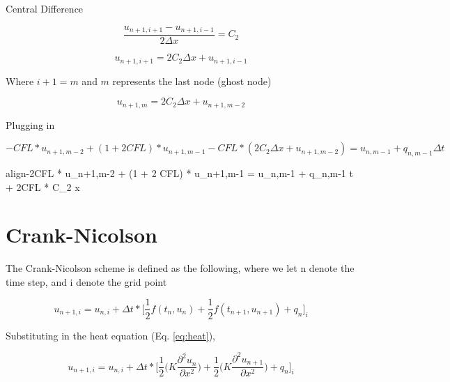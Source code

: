 \documentclass[10pt, letter, showtrims]{extarticle}
\newcommand{\boxedeq}[2]{\begin{empheq}[box={\fboxsep=6pt\fbox}]{align}\label{#1}#2\end{empheq}}
\begin{document}
    		\noindent
    		Central Difference
    		
    		\begin{equation}
    			\frac{u_{n+1,i+1} - u_{n+1,i-1}}{2 \Delta x} = C_{2}
    		\end{equation}
    		
    		\begin{equation}
    			u_{n+1,i+1} = 2 C_{2} \Delta x + u_{n+1,i-1}
    		\end{equation}
    		
    		\noindent
    		Where $i+1 = m$ and $m$ represents the last node (ghost node)
    		
    		\begin{equation}
    			u_{n+1,m} = 2 C_{2} \Delta x + u_{n+1,m-2}
    		\end{equation}
    		
    		\noindent
    		Plugging in

		\begin{equation}
			-CFL * u_{n+1,m-2} + (1 + 2 CFL) * u_{n+1,m-1} - CFL * (2 C_{2} \Delta x + u_{n+1,m-2}) = u_{n,m-1} + q_{n,m-1} \Delta t
		\end{equation}    		
    		
    		\boxedeq{}{-2CFL * u_{n+1,m-2} + (1 + 2 CFL) * u_{n+1,m-1} = u_{n,m-1} + q_{n,m-1} \Delta t + 2CFL * C_{2} \Delta x}
    		
		\pagebreak
		
		\noindent
		\section{Crank-Nicolson}
		
		\noindent
		The Crank-Nicolson scheme is defined as the following, where we let n denote the time step, and i denote the grid point
		
		\begin{equation}
			u_{n+1,i} = u_{n,i} + \Delta t * \Big[ \frac{1}{2} f(t_{n}, u_{n}) + \frac{1}{2} f(t_{n+1}, u_{n+1}) + q_{n} \Big]_{i}
		\end{equation}
		
		\noindent
		Substituting in the heat equation (Eq. \ref{eq:heat}),
		
		\begin{equation}
			u_{n+1,i} = u_{n,i} + \Delta t * \Big[ \frac{1}{2} \big( K \frac{\partial^{2} u_{n}}{\partial x^{2}} \big) + \frac{1}{2} \big( K \frac{\partial^{2} u_{n+1}}{\partial x^{2}} \big) + q_{n} \Big]_{i}
		\end{equation}
		
\end{document}
